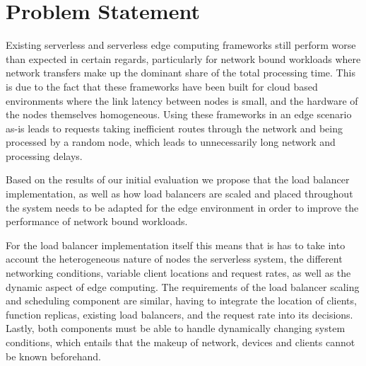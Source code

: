 \section{Problem Statement}




Existing serverless and serverless edge computing frameworks still perform worse than expected in certain regards, particularly for network bound workloads where network transfers make up the dominant share of the total processing time\cite{skippy}.
This is due to the fact that these frameworks have been built for cloud based environments where the link latency between nodes is small, and the hardware of the nodes themselves homogeneous.
Using these frameworks in an edge scenario as-is leads to requests taking inefficient routes through the network and being processed by a random node, which leads to unnecessarily long network and processing delays.

Based on the results of our initial evaluation we propose that the load balancer implementation, as well as how load balancers are scaled and placed throughout the system needs to be adapted for the edge environment in order to improve the performance of network bound workloads.

For the load balancer implementation itself this means that is has to take into account the heterogeneous nature of nodes the serverless system, the different networking conditions, variable client locations and request rates, as well as the dynamic aspect of edge computing.
The requirements of the load balancer scaling and scheduling component are similar, having to integrate the location of clients, function replicas, existing load balancers, and the request rate into its decisions.
Lastly, both components must be able to handle dynamically changing system conditions, which entails that the makeup of network, devices and clients cannot be known beforehand.